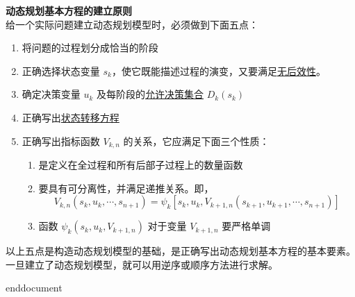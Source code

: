 	\begin{notebox}{\textbf{动态规划基本方程的建立原则}}
		\\
	给一个实际问题建立动态规划模型时，必须做到下面五点：
	\begin{enumerate}[label=(\arabic*)]
		\item 将问题的过程划分成恰当的阶段
		
		\item 正确选择状态变量 \( s_k \)，使它既能描述过程的演变，又要满足\hyperref[dfn:无后效性]{无后效性}。
		
		\item 确定决策变量 \( u_k \) 及每阶段的\hyperref[允许决策集合]{允许决策集合} \( D_k(s_k) \)
		
		\item 正确写出\hyperref[dfn:状态转移方程]{状态转移方程}
	
		\item 正确写出指标函数 \( V_{k,n} \) 的关系，它应满足下面三个性质：
		\begin{enumerate}[label=\roman*.]
			\item 是定义在全过程和所有后部子过程上的数量函数
			
			\item 要具有可分离性，并满足递推关系。即，
			\[V_{k,n}(s_k, u_k, \cdots, s_{n+1}) = \psi_k[s_k, u_k, V_{k+1,n}(s_{k+1}, u_{k+1}, \cdots, s_{n+1})]\]
			
			\item 函数 \(\psi_k(s_k, u_k, V_{k+1,n})\) 对于变量 \( V_{k+1,n} \) 要严格单调
		\end{enumerate}
	\end{enumerate}
	以上五点是构造动态规划模型的基础，是正确写出动态规划基本方程的基本要素。
	\\一旦建立了动态规划模型，就可以用逆序或顺序方法进行求解。
\end{notebox}
	

\ifx\allfiles\undefined
	
	
	end{document}
	\else
	\fi
